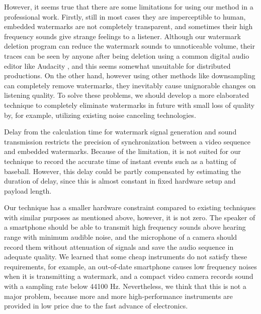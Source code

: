 However, it seems true that there are some limitations for using our method in a professional work.
Firstly, still in most cases they are imperceptible to human, embedded watermarks are not completely transparent, and sometimes their high frequency sounds give strange feelings to a listener.
Although our watermark deletion program can reduce the watermark sounds to unnoticeable volume, their traces can be seen by anyone after being deletion using a common digital audio editor like Audacity \cite{audacity}, and this seems somewhat unsuitable for distributed productions.
On the other hand, however using other methods like downsampling can completely remove watermarks, they inevitably cause unignorable changes on listening quality.
To solve these problems, we should develop a more elaborated technique to completely eliminate watermarks in future with small loss of quality by, for example, utilizing existing noise canceling technologies.

Delay from the calculation time for watermark signal generation and sound transmission restricts the precision of synchronization between a video sequence and embedded watermarks.
Because of the limitation, it is not suited for our technique to record the accurate time of instant events such as a batting of baseball.
However, this delay could be partly compensated by estimating the duration of delay, since this is almost constant in fixed hardware setup and payload length.

Our technique has a smaller hardware constraint compared to existing techniques with similar purposes as mentioned above, however, it is not zero.
The speaker of a smartphone should be able to transmit high frequency sounds above hearing range with minimum audible noise, and the microphone of a camera should record them without attenuation of signals and save the audio sequence in adequate quality.
We learned that some cheap instruments do not satisfy these requirements, for example, an out-of-date smartphone causes low frequency noises when it is transmitting a watermark, and a compact video camera records sound with a sampling rate below 44100 Hz.
Nevertheless, we think that this is not a major problem, because more and more high-performance instruments are provided in low price due to the fast advance of electronics.
